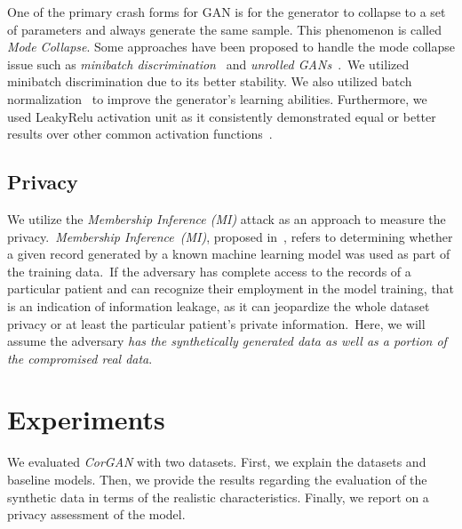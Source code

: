 \documentclass[letterpaper]{article} \usepackage{aaai20}  \usepackage{times}  \usepackage{helvet} \usepackage{courier}  \usepackage[hyphens]{url}  \usepackage{graphicx} \urlstyle{rm} \def\UrlFont{\rm}  \usepackage{graphicx}  \frenchspacing  \setlength{\pdfpagewidth}{8.5in}  \setlength{\pdfpageheight}{11in}
\begin{document}
One of the primary crash forms for GAN is for the generator to collapse to a set of parameters and always generate the same sample.
This phenomenon is called \textit{Mode Collapse}. Some approaches have been proposed to handle the mode collapse issue such as \textit{minibatch discrimination}~\cite{salimans2016improved} and \textit{unrolled GANs}~\cite{metz2016unrolled}.~We utilized minibatch discrimination due to its better stability. We also utilized batch normalization~\cite{ioffe2015batch} to improve the generator's learning abilities. Furthermore, we used LeakyRelu activation unit \cite{maas2013rectifier} as it consistently demonstrated equal or better results over other common activation functions~\cite{xu2015empirical}.







\subsection{Privacy}\label{sec:Methodsub:Privacy}



We utilize the \textit{Membership Inference (MI)} attack as an approach to measure the privacy.~\textit{Membership Inference~(MI)}, proposed in~\cite{shokri2017membership}, refers to determining whether a given record generated by a known machine learning model was used as part of the training data.~If the adversary has complete access to the records of a particular patient and can recognize their employment in the model training, that is an indication of information leakage, as it can jeopardize the whole dataset privacy or at least the particular patient's private information.~Here, we will assume the adversary \textit{has the synthetically generated data as well as a portion of the compromised real data}.






\section{Experiments}\label{sec:Experiments}

We evaluated \textit{CorGAN} with two datasets.
First, we explain the datasets and baseline models.
Then, we provide the results regarding the evaluation of the synthetic data in terms of the realistic characteristics. 
Finally, we report on a privacy assessment of the model.
\end{document}
